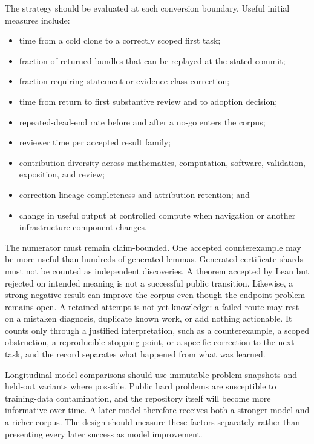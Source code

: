 \documentclass[10pt]{article}
\begin{document}
The strategy should be evaluated at each conversion boundary.  Useful initial
measures include:

\begin{itemize}
\item time from a cold clone to a correctly scoped first task;
\item fraction of returned bundles that can be replayed at the stated commit;
\item fraction requiring statement or evidence-class correction;
\item time from return to first substantive review and to adoption decision;
\item repeated-dead-end rate before and after a no-go enters the corpus;
\item reviewer time per accepted result family;
\item contribution diversity across mathematics, computation, software,
      validation, exposition, and review;
\item correction lineage completeness and attribution retention; and
\item change in useful output at controlled compute when navigation or another
      infrastructure component changes.
\end{itemize}

The numerator must remain claim-bounded.  One accepted counterexample may be
more useful than hundreds of generated lemmas.  Generated certificate shards
must not be counted as independent discoveries.  A theorem accepted by Lean
but rejected on intended meaning is not a successful public transition.
Likewise, a strong negative result can improve the corpus even though the
endpoint problem remains open.  A retained attempt is not yet knowledge: a
failed route may rest on a mistaken diagnosis, duplicate known work, or add
nothing actionable.  It counts only through a justified interpretation, such as
a counterexample, a scoped obstruction, a reproducible stopping point, or a
specific correction to the next task, and the record separates what happened
from what was learned.

Longitudinal model comparisons should use immutable problem snapshots and
held-out variants where possible.  Public hard problems are susceptible to
training-data contamination, and the repository itself will become more
informative over time.  A later model therefore receives both a stronger
model and a richer corpus.  The design should measure these factors
separately rather than presenting every later success as model improvement.
\end{document}
